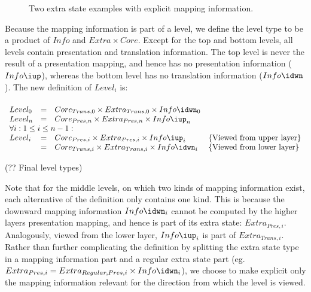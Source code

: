 \begin{figure}
\begin{center}
\begin{center}
\end{center}
\caption{Two extra state examples with explicit mapping information.}\label{coreExtraInfoExamples} 
\end{center}
\end{figure}

Because the mapping information is part of a level, we define the level type to be a product of $Info$ and 
$Extra \times Core$. Except for the top and bottom levels, all levels contain presentation and translation information. The top level is never the result of a presentation mapping, and hence has no presentation information ($Info\iup$), whereas the bottom level has no translation information ($Info\idwn$). The new definition of $Level_i$ is:

\begin{small}\begin{align*}%
\end{align*} 
\(\begin{array}{lcll}
Level_{0} & = & Core_{Trans,0} \times Extra_{Trans,0} \times Info\idwn_{0} \\
Level_{n} & = & Core_{Pres,n} \times Extra_{Pres,n} \times  Info\iup_{n}\\
\lefteqn{\forall i:1 \le i \le n-1:}  \\
Level_{i} & = & Core_{Pres,i} \times Extra_{Pres,i}  \times Info\iup_{i} & \text{\{Viewed from upper layer\}}\\  
               & = & Core_{Trans,i} \times Extra_{Trans,i} \times Info\idwn_{i} & \text{\{Viewed from lower layer\}}
\end{array}\)\end{small}
\begin{center}(?? Final level types)\end{center}\vspace{1em}

Note that for the middle levels, on which two kinds of mapping information exist, each alternative of the definition only contains one kind. This is because the downward mapping information $Info\idwn_{i}$ cannot be computed by the higher layers presentation mapping, and hence is part of its extra state: $Extra_{Pres,i}$. Analogously, viewed from the lower layer, $Info\iup_{i}$ is part of $Extra_{Trans,i}$. Rather than further complicating the definition by splitting the extra state type in a mapping information part and a regular extra state part (eg. $Extra_{Pres,i} = Extra_{Regular,Pres,i} \times Info\idwn_{i}$), we choose to make explicit only the mapping information relevant for the direction from which the level is viewed.

